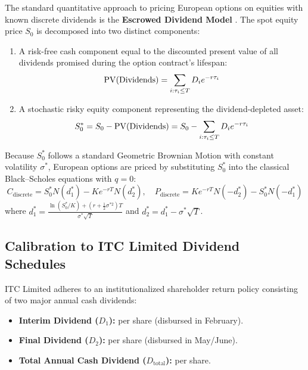 The standard quantitative approach to pricing European options on equities with known discrete dividends is the \textbf{Escrowed Dividend Model} \citep{hull2018options}. The spot equity price $S_0$ is decomposed into two distinct components:
\begin{enumerate}[leftmargin=1.5em, itemsep=1pt, parsep=0pt, label=(\alph*)]
    \item A risk-free cash component equal to the discounted present value of all dividends promised during the option contract's lifespan:
    \begin{equation}
        \operatorname{PV}(\text{Dividends}) = \sum_{i: \tau_i \le T} D_i e^{-r \tau_i}
        \label{eq:pv_dividends}
    \end{equation}
    \item A stochastic risky equity component representing the dividend-depleted asset:
    \begin{equation}
        S_0^* = S_0 - \operatorname{PV}(\text{Dividends}) = S_0 - \sum_{i: \tau_i \le T} D_i e^{-r \tau_i}
        \label{eq:s_star}
    \end{equation}
\end{enumerate}
Because $S_0^*$ follows a standard Geometric Brownian Motion with constant volatility $\sigma^*$, European options are priced by substituting $S_0^*$ into the classical Black--Scholes equations with $q = 0$:
\begin{equation}
    C_{\text{discrete}} = S_0^* N(d_1^*) - K e^{-rT} N(d_2^*), \quad P_{\text{discrete}} = K e^{-rT} N(-d_2^*) - S_0^* N(-d_1^*)
    \label{eq:discrete_bs}
\end{equation}
where $d_1^* = \frac{\ln(S_0^* / K) + (r + \frac{1}{2}\sigma^{*2})T}{\sigma^* \sqrt{T}}$ and $d_2^* = d_1^* - \sigma^* \sqrt{T}$.

\subsection{Calibration to ITC Limited Dividend Schedules}

ITC Limited adheres to an institutionalized shareholder return policy consisting of two major annual cash dividends:
\begin{itemize}[leftmargin=1.5em, itemsep=1pt, parsep=0pt]
    \item \textbf{Interim Dividend ($D_1$):}  per share (disbursed in February).
    \item \textbf{Final Dividend ($D_2$):}  per share (disbursed in May/June).
    \item \textbf{Total Annual Cash Dividend ($D_{\text{total}}$):}  per share.
\end{itemize}

